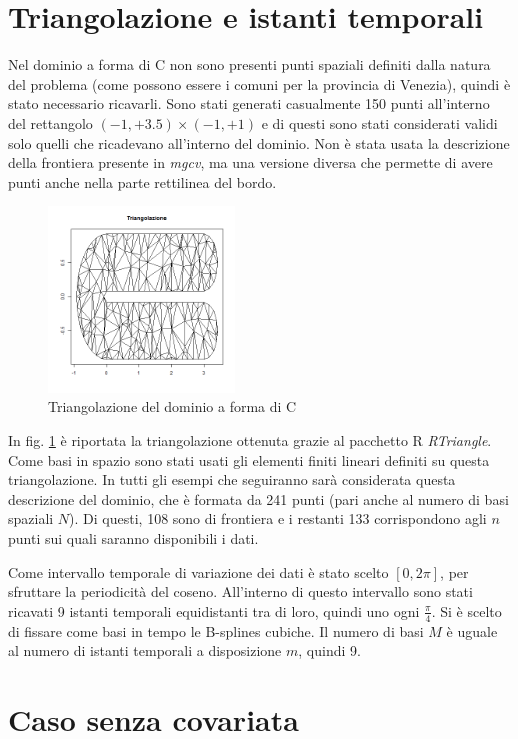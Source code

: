 \documentclass[a4paper,11pt,twoside,openright]{book}							%
\begin{document}
\section{Triangolazione e istanti temporali}
Nel dominio a forma di C non sono presenti punti spaziali definiti dalla natura del problema (come possono essere i comuni per la provincia di Venezia), quindi è stato necessario ricavarli. Sono stati generati casualmente 150 punti all'interno del rettangolo $(-1,+3.5) \times (-1,+1)$ e di questi sono stati considerati validi solo quelli che ricadevano all'interno del dominio. Non è stata usata la descrizione della frontiera presente in \textit{mgcv}, ma una versione diversa che permette di avere punti anche nella parte rettilinea del bordo.
\begin{figure}[t]
	\centering
	\includegraphics[width=0.44\textwidth]{Immagini/DomCinizio/DomC_Triangolazione.png}
	\caption{Triangolazione del dominio a forma di C}
	\label{fig:domC_triang}
\end{figure}
In fig. \ref{fig:domC_triang} è riportata la triangolazione ottenuta grazie al pacchetto R \textit{RTriangle}. Come basi in spazio sono stati usati gli elementi finiti lineari definiti su questa triangolazione. In tutti gli esempi che seguiranno sarà considerata questa descrizione del dominio, che è formata da 241 punti (pari anche al numero di basi spaziali $N$). Di questi, 108 sono di frontiera e i restanti 133 corrispondono agli $n$ punti sui quali saranno disponibili i dati.

Come intervallo temporale di variazione dei dati è stato scelto $[0,2\pi]$, per sfruttare la periodicità del coseno. All'interno di questo intervallo sono stati ricavati 9 istanti temporali equidistanti tra di loro, quindi uno ogni $\frac{\pi}{4}$. Si è scelto di fissare come basi in tempo le B-splines cubiche. Il numero di basi $M$ è uguale al numero di istanti temporali a disposizione $m$, quindi 9. 
\newpage
\section{Caso senza covariata}
\end{document}
